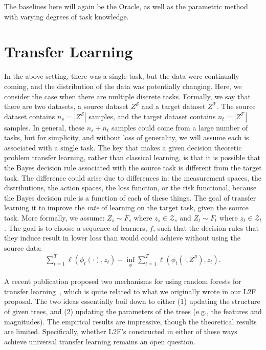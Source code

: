 \documentclass{article}
\begin{document}
The baselines here will again be the Oracle, as well as the parametric method with varying degrees of task knowledge. 

\clearpage
\section{Transfer Learning}
\label{sec:transfer}

In the above setting, there was a single task, but the data were continually coming, and the distribution of the data was potentially changing.  Here, we consider the case when there are multiple discrete tasks.  Formally, we say that there are two datasets, a source dataset $Z^\mathcal{S}$ and a target dataset $Z^\mathcal{T}$. The source dataset contains $n_s = | Z^\mathcal{S}|$ samples, and the target dataset contains $n_t = |Z^\mathcal{T}|$ samples. In general, these $n_s+n_t$ samples could come from a large number of tasks, but for simplicity, and without loss of generality, we will assume each is associated with a single task. The key that makes a given decision theoretic problem transfer learning, rather than classical learning, is that it is possible that the Bayes decision rule associated with the source task is different from the target task.  The difference could arise due to differences in: the measurement spaces, the distributions, the action spaces, the loss function, or the risk functional, because the Bayes decision rule is a function of each of these things.  The goal of transfer learning it to improve the \emph{rate} of learning on the target task, given the source task. More formally, we assume:
$Z_s \sim F_s$ where $z_s \in \mathcal{Z}_s$ and 
$Z_t \sim F_t$ where $z_t \in \mathcal{Z}_t$. 
The goal is to choose a sequence of learners, $f$, such that the decision rules that they induce result in lower loss than would could achieve without using the source data:
\begin{align}
    \sum_{t=1}^T \ell(\phi_t( \cdot), z_t)    - \inf_{\phi} \sum_{t=1}^T \ell(\phi_t( \cdot, Z^\mathcal{S}), z_t).
\end{align}

A recent publication proposed two mechanisms for using random forests for transfer learning~\cite{Segev2016}, which is quite related to what we originally wrote in our L2F proposal. The two ideas essentially boil down to either (1) updating the structure of given trees, and (2) updating the parameters of the trees (e.g., the features and magnitudes).  The empirical results are impressive, though the theoretical results are limited.  Specifically, whether L2F's constructed in either of these ways achieve universal transfer learning remains an open question.  
\end{document}
